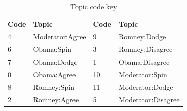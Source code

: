 \begin{table}[H]
\begin{centering}
\begin{tabular}{ l | l | l | l }
 Code & Topic & Code & Topic \\
\hline
4 & Moderator:Agree & 9 & Romney:Dodge \\
6 & Obama:Spin & 3 & Romney:Disagree \\
7 & Obama:Dodge & 1 & Obama:Disagree \\
0 & Obama:Agree & 10 & Moderator:Spin \\
8 & Romney:Spin & 11 & Moderator:Dodge \\
2 & Romney:Agree & 5 & Moderator:Disagree \\

\end{tabular}
\caption{Topic code key}
\end{centering}
\end{table}